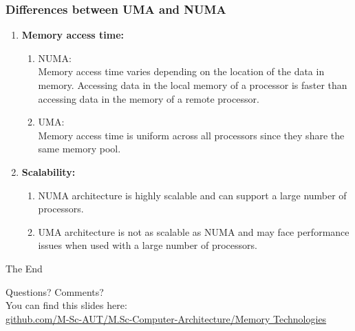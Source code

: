 \documentclass[
	12pt, %
]{beamer}
\begin{document}
\begin{frame}
	\frametitle{Differences between UMA and NUMA}
	
	\begin{enumerate}
		\item \textbf{Memory access time: }
		\begin{enumerate}
			\item NUMA: \\ Memory access time varies depending on the location of the data in memory. Accessing data in the local memory of a processor is faster than accessing data in the memory of a remote processor.
			
			\item UMA: \\ Memory access time is uniform across all processors since they share the same memory pool.
		\end{enumerate}
		\item \textbf{Scalability: }
		\begin{enumerate}
			\item NUMA architecture is highly scalable and can support a large number of processors.
			
			\item UMA architecture is not as scalable as NUMA and may face performance issues when used with a large number of processors.
		\end{enumerate}
	\end{enumerate}
	
\end{frame}





\begin{frame}[plain] %
	\begin{center}
		{\Huge The End}
		
		\bigskip\bigskip %
		
		{\LARGE Questions? Comments?}\\
		You can find this slides here:\\
		\textcolor{blue}{\href{https://github.com/M-Sc-AUT/M.Sc-Computer-Architecture/tree/main/Memory Technologies}{github.com/M-Sc-AUT/M.Sc-Computer-Architecture/Memory Technologies}}
	\end{center}
\end{frame}

\end{document}
